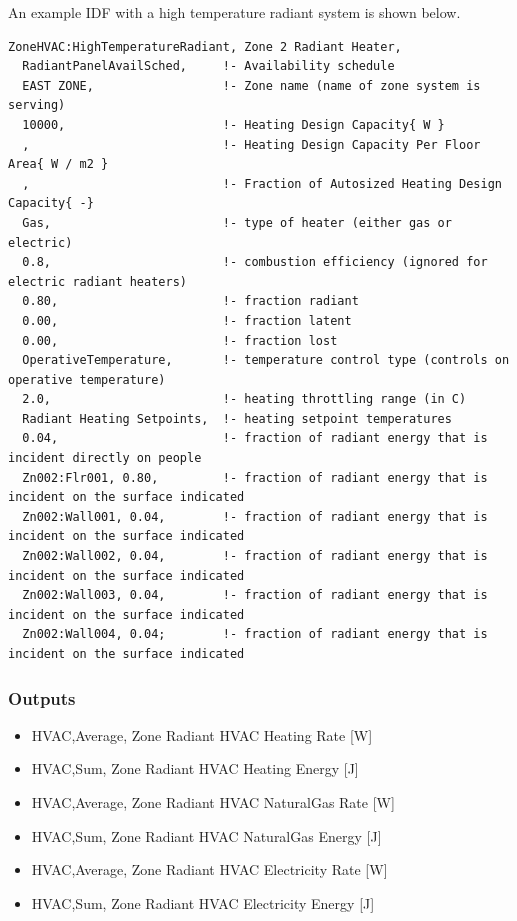 An example IDF with a high temperature radiant system is shown below.

\begin{lstlisting}
ZoneHVAC:HighTemperatureRadiant, Zone 2 Radiant Heater,
  RadiantPanelAvailSched,     !- Availability schedule
  EAST ZONE,                  !- Zone name (name of zone system is serving)
  10000,                      !- Heating Design Capacity{ W }
  ,                           !- Heating Design Capacity Per Floor Area{ W / m2 }
  ,                           !- Fraction of Autosized Heating Design Capacity{ -}
  Gas,                        !- type of heater (either gas or electric)
  0.8,                        !- combustion efficiency (ignored for electric radiant heaters)
  0.80,                       !- fraction radiant
  0.00,                       !- fraction latent
  0.00,                       !- fraction lost
  OperativeTemperature,       !- temperature control type (controls on operative temperature)
  2.0,                        !- heating throttling range (in C)
  Radiant Heating Setpoints,  !- heating setpoint temperatures
  0.04,                       !- fraction of radiant energy that is incident directly on people
  Zn002:Flr001, 0.80,         !- fraction of radiant energy that is incident on the surface indicated
  Zn002:Wall001, 0.04,        !- fraction of radiant energy that is incident on the surface indicated
  Zn002:Wall002, 0.04,        !- fraction of radiant energy that is incident on the surface indicated
  Zn002:Wall003, 0.04,        !- fraction of radiant energy that is incident on the surface indicated
  Zn002:Wall004, 0.04;        !- fraction of radiant energy that is incident on the surface indicated
\end{lstlisting}

\subsubsection{Outputs}\label{outputs-8-006}

\begin{itemize}
\item
  HVAC,Average, Zone Radiant HVAC Heating Rate {[}W{]}
\item
  HVAC,Sum, Zone Radiant HVAC Heating Energy {[}J{]}
\item
  HVAC,Average, Zone Radiant HVAC NaturalGas Rate {[}W{]}
\item
  HVAC,Sum, Zone Radiant HVAC NaturalGas Energy {[}J{]}
\item
  HVAC,Average, Zone Radiant HVAC Electricity Rate {[}W{]}
\item
  HVAC,Sum, Zone Radiant HVAC Electricity Energy {[}J{]}
\end{itemize}

